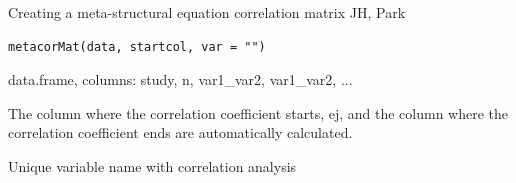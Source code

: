 \documentclass[a4paper]{book}
\begin{document}
%
\begin{Description}
Creating a meta-structural equation correlation matrix JH, Park
\end{Description}
%
\begin{Usage}
\begin{verbatim}
metacorMat(data, startcol, var = "")
\end{verbatim}
\end{Usage}
%
\begin{Arguments}
\begin{ldescription}
\item[\code{data}] data.frame, columns:  study, n, var1\_var2, var1\_var2, ...

\item[\code{startcol}] The column where the correlation coefficient starts, ej, and the column where the correlation coefficient ends are automatically calculated.

\item[\code{var}] Unique variable name with correlation analysis
\end{ldescription}
\end{Arguments}
%
\end{document}
